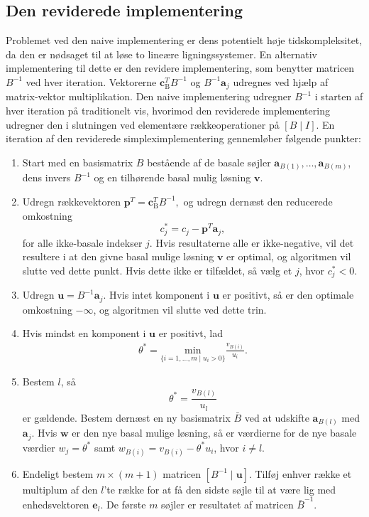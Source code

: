 \subsection{Den reviderede implementering}
Problemet ved den naive implementering er dens potentielt høje tidskompleksitet, da den er nødsaget til at løse to lineære ligningssystemer.
En alternativ implementering til dette er den revidere implementering, som benytter matricen $B^{-1}$ ved hver iteration.
Vektorerne $\mathbf{c}_{\text{B}}^T B^{-1}$ og $B^{-1} \mathbf{a}_j$ udregnes ved hjælp af matrix-vektor multiplikation.
Den naive implementering udregner $B^{-1}$ i starten af hver iteration på traditionelt vis, hvorimod den reviderede implementering udregner den i slutningen ved elementære rækkeoperationer på $[B \mid I]$.
En iteration af den reviderede simpleximplementering gennemløber følgende punkter: 
% 
\begin{tcolorbox}[
title=Den reviderede implementering,
colback		= myblue!15,
colframe	= myblue!15,
coltitle	= black,
before skip	= 20pt plus 2pt,
after skip	= 20pt plus 2pt,
fonttitle	= \bfseries]
\begin{enumerate}
\item Start med en basismatrix $B$ bestående af de basale søjler $\textbf{a}_{B(1)},\ldots,\textbf{a}_{B(m)}$, dens invers $B^{-1}$ og en tilhørende basal mulig løsning $\mathbf{v}$. 
\item Udregn rækkevektoren $\mathbf{p}^T=\mathbf{c}_{\text{B}}^T B^{-1},$ og udregn dernæst den reducerede omkostning $$c_j^* = c_j - \mathbf{p}^T \mathbf{a}_j,$$ for alle ikke-basale indekser $j$.
Hvis resultaterne alle er ikke-negative, vil det resultere i at den givne basal mulige løsning $\textbf{v}$ er optimal, og algoritmen vil slutte ved dette punkt.
Hvis dette ikke er tilfældet, så vælg et $j$, hvor $c_j^* < 0$.
\item Udregn $\mathbf{u}=B^{-1}\mathbf{a}_j$.
Hvis intet komponent i $\mathbf{u}$ er positivt, så er den optimale omkostning $-\infty$, og algoritmen vil slutte ved dette trin. 
%
\item Hvis mindst en komponent i $\mathbf{u}$ er positivt, lad 
\begin{align*}
\theta^*=\underset{\{i=1,\ldots,m \mid u_i>0\}}{\text{min}}\frac{v_{B(i)}}{u_i}.
\end{align*}
\item Bestem $l$, så $$\theta^*=\frac{v_{B(l)}}{u_l}$$ er gældende.
Bestem dernæst en ny basismatrix  $\bar{B}$ ved at udskifte $\mathbf{a}_{B(l)}$ med $\mathbf{a}_j$.
Hvis $\mathbf{w}$ er den nye basal mulige løsning, så er værdierne for de nye basale værdier $w_j=\theta^*$ samt $w_{B(i)}=v_{B(i)}-\theta^*u_i$, hvor $i \neq l$.
\item Endeligt bestem $m \times (m+1)$ matricen $\left [B^{-1} \mid \mathbf{u} \right ]$.
Tilføj enhver række et multiplum af den $l$'te række for at få den sidste søjle til at være lig med enhedsvektoren $\mathbf{e}_l$.
De første $m$ søjler er resultatet af matricen $\bar{B}^{-1}$.
\end{enumerate}
\end{tcolorbox}
\noindent
\newpage
%
%
